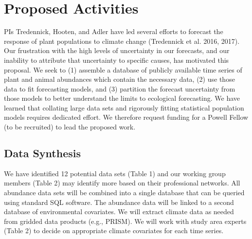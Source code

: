 \documentclass[12pt,]{article}
\begin{document}
\section{Proposed Activities}

PIs Tredennick, Hooten, and Adler have led several efforts to forecast
the response of plant populations to climate change (Tredennick et al.
2016, 2017). Our frustration with the high levels of uncertainty in our
forecasts, and our inability to attribute that uncertainty to specific
causes, has motivated this proposal. We seek to (1) assemble a database
of publicly available time series of plant and animal abundances which
contain the necessary data, (2) use those data to fit forecasting
models, and (3) partition the forecast uncertainty from those models to
better understand the limits to ecological forecasting. We have learned
that collating large data sets and rigorously fitting statistical
population models requires dedicated effort. We therefore request
funding for a Powell Fellow (to be recruited) to lead the proposed work.

\subsection{Data Synthesis}

We have identified 12 potential data sets (Table 1) and our working
group members (Table 2) may identify more based on their professional
networks. All abundance data sets will be combined into a single
database that can be queried using standard SQL software. The abundance
data will be linked to a second database of environmental covariates. We
will extract climate data as needed from gridded data products (e.g.,
PRISM). We will work with study area experts (Table 2) to decide on
appropriate climate covariates for each time series.

\footnotesize
\end{document}
